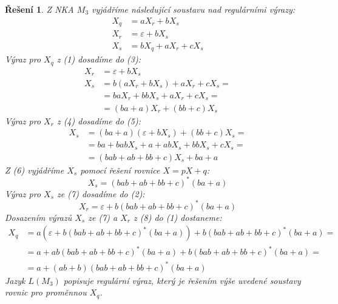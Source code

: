 \documentclass[11pt, a4paper]{article}
\theoremstyle{result}
\newtheorem*{result}{Řešení}
\begin{document}
\begin{enumerate}
\begin{enumerate}
        \begin{result}
            Z NKA $M_3$ vyjádříme následující soustavu nad regulárními výrazy:
            \begin{align}
                X_q &= aX_r + bX_s \\
                X_r &= \varepsilon + bX_s \\
                X_s &= bX_q + aX_r + cX_s
            \end{align}
            Výraz pro $X_q$ z (1) dosadíme do (3):
            \begin{align}
                X_r &= \varepsilon + bX_s \\
                X_s &= b(aX_r + bX_s) + aX_r + cX_s = \nonumber \\
                    &= baX_r + bbX_s + aX_r + cX_s = \nonumber \\
                    &= (ba + a)X_r + (bb + c)X_s
            \end{align}
            Výraz pro $X_r$ z (4) dosadíme do (5):
            \begin{align}
                X_s &= (ba + a)(\varepsilon + bX_s) + (bb + c)X_s = \nonumber \\
                    &= ba + babX_s + a + abX_s + bbX_s + cX_s = \nonumber \\
                    &= (bab + ab + bb + c)X_s + ba + a
            \end{align}
            Z (6) vyjádříme $X_s$ pomocí řešení rovnice $X = pX + q$:
            \begin{equation}
                X_s = (bab + ab + bb + c)^*(ba + a)
            \end{equation}
            Výraz pro $X_s$ ze (7) dosadíme do (2):
            \begin{equation}
                X_r = \varepsilon + b(bab + ab + bb + c)^*(ba + a)
            \end{equation}
            Dosazením výrazů $X_s$ ze (7) a $X_r$ z (8) do (1) dostaneme:
            \begin{align}
                X_q &= a(\varepsilon + b(bab + ab + bb + c)^*(ba + a)) + b(bab + ab + bb + c)^*(ba + a) = \nonumber \\
                    &= a + ab(bab + ab + bb + c)^*(ba + a) + b(bab + ab + bb + c)^*(ba + a) = \nonumber \\
                    &= a + (ab + b)(bab + ab + bb + c)^*(ba + a)
            \end{align}
            Jazyk $L(M_3)$ popisuje regulární výraz, který je řešením výše uvedené soustavy rovnic pro pro\-měnnou $X_q$.
        \end{result}
        

\end{enumerate}
\end{enumerate}
\end{document}

